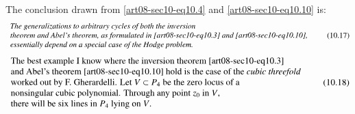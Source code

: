 The conclusion drawn from \eqref{art08-sec10-eq10.4} and \eqref{art08-sec10-eq10.10} is:
\begin{equation*}
\begin{array}{l}
\text{\em The generalizations to arbitrary cycles of both the inversion}\\
\text{\em theorem and Abel's theorem, as formulated in \eqref{art08-sec10-eq10.3} and \eqref{art08-sec10-eq10.10},}\\
\text{\em essentially depend on a special case of the Hodge problem.}
\end{array}\tag{10.17}\label{art08-sec10-eq10.17}
\end{equation*}
\begin{equation*}
\begin{array}{l}
\text{The best example I know where the inversion theorem \eqref{art08-sec10-eq10.3}}\\
\text{and Abel's theorem \eqref{art08-sec10-eq10.10} hold is the case of the {\em cubic threefold}}\\
\text{worked out by F. Gherardelli. Let $V\subset P_{4}$ be the zero locus of a}\\
\text{nonsingular cubic polynomial. Through any point $z_{0}$ in $V$,}\\
\text{there will be six lines in $P_{4}$ lying on $V$.}
\end{array}\tag{10.18}\label{art08-sec10-eq10.18}
\end{equation*}\pageoriginale

